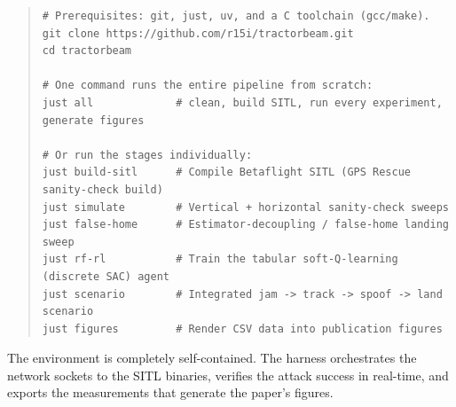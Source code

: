 \documentclass[11pt]{article}
\begin{document}
\begin{quote}\small
\begin{verbatim}
# Prerequisites: git, just, uv, and a C toolchain (gcc/make).
git clone https://github.com/r15i/tractorbeam.git
cd tractorbeam

# One command runs the entire pipeline from scratch:
just all             # clean, build SITL, run every experiment, generate figures

# Or run the stages individually:
just build-sitl      # Compile Betaflight SITL (GPS Rescue sanity-check build)
just simulate        # Vertical + horizontal sanity-check sweeps
just false-home      # Estimator-decoupling / false-home landing sweep
just rf-rl           # Train the tabular soft-Q-learning (discrete SAC) agent
just scenario        # Integrated jam -> track -> spoof -> land scenario
just figures         # Render CSV data into publication figures
\end{verbatim}
\end{quote}

The environment is completely self-contained. The harness orchestrates the network sockets to the SITL binaries, verifies the attack success in real-time, and exports the measurements that generate the paper's figures.
\end{document}
